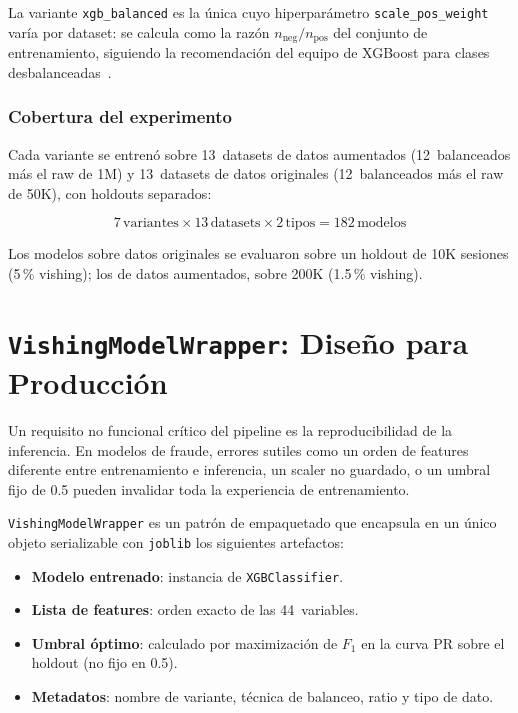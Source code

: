 \documentclass[journal]{IEEEtran}
\newcommand{\wrapcls}{\texttt{VishingModelWrapper}}
\begin{document}
La variante \texttt{xgb\_balanced} es la única cuyo hiperparámetro
\texttt{scale\_pos\_weight} varía por dataset: se calcula como la razón
$n_{\text{neg}}/n_{\text{pos}}$ del conjunto de entrenamiento, siguiendo la
recomendación del equipo de XGBoost para clases desbalanceadas~\cite{chen2016xgboost}.

\subsubsection{Cobertura del experimento}

Cada variante se entrenó sobre 13~datasets de datos aumentados (12~balanceados
más el raw de 1M) y 13~datasets de datos originales (12~balanceados más el raw
de 50K), con holdouts separados:

\[
7\,\text{variantes} \times 13\,\text{datasets} \times 2\,\text{tipos} = 182\,\text{modelos}
\]

Los modelos sobre datos originales se evaluaron sobre un holdout de 10K
sesiones (5\,\% vishing); los de datos aumentados, sobre 200K (1.5\,\% vishing).

\section{\wrapcls{}: Diseño para Producción}
\label{sec:wrapper}

Un requisito no funcional crítico del pipeline es la reproducibilidad de la
inferencia. En modelos de fraude, errores sutiles como un orden de features
diferente entre entrenamiento e inferencia, un scaler no guardado, o un umbral
fijo de 0.5 pueden invalidar toda la experiencia de entrenamiento.

\wrapcls{} es un patrón de empaquetado que encapsula en un único objeto
serializable con \texttt{joblib} los siguientes artefactos:

\begin{itemize}
    \item \textbf{Modelo entrenado}: instancia de \texttt{XGBClassifier}.
    \item \textbf{Lista de features}: orden exacto de las 44~variables.
    \item \textbf{Umbral óptimo}: calculado por maximización de $F_1$ en la
    curva PR sobre el holdout (no fijo en 0.5).
    \item \textbf{Metadatos}: nombre de variante, técnica de balanceo, ratio
    y tipo de dato.
\end{itemize}
\end{document}
